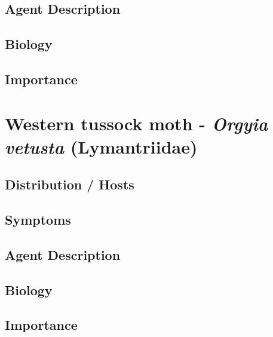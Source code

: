 \documentclass[
]{book}
\begin{document}
\subsection*{Agent Description}\label{agent-description-3}

\subsection*{Biology}\label{biology-3}

\subsection*{Importance}\label{importance-3}

\section*{\texorpdfstring{Western tussock moth - \emph{Orgyia vetusta} (Lymantriidae)}{Western tussock moth - Orgyia vetusta (Lymantriidae)}}\label{western-tussock-moth---orgyia-vetusta-lymantriidae}

\subsection*{Distribution / Hosts}\label{distribution-hosts-4}

\subsection*{Symptoms}\label{symptoms-4}

\subsection*{Agent Description}\label{agent-description-4}

\subsection*{Biology}\label{biology-4}

\subsection*{Importance}\label{importance-4}
\end{document}
